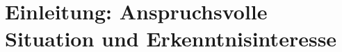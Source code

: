 \documentclass[ngerman, a4paper]{article}
\begin{document}



\newpage
{}
\renewcommand{\thepage}{\arabic{page}}

\section*{Einleitung: Anspruchsvolle Situation und Erkenntnisinteresse}
\label{sec:einleitung}
\end{document}
